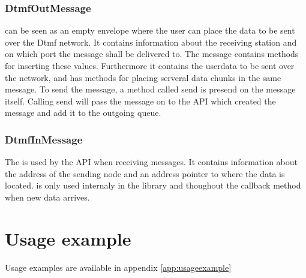 \subsubsection{DtmfOutMessage}
 can be seen as an empty envelope where the user can place the data to be sent over the Dtmf network. It contains information about the receiving station and on which port the message shall be delivered to. The message contains methods for inserting these values. Furthermore it contains the userdata to be sent over the network, and has methods for placing serveral data chunks in the same message. To send the message, a method called send is presend on the message itself. Calling send will pass the message on to the API which created the message and add it to the outgoing queue.

\subsubsection{DtmfInMessage}
The  is used by the API when receiving messages. It contains information about the address of the sending node and an address pointer to where the data is located.  is only used internaly in the library and thoughout the callback method when new data arrives.

\section{Usage example}
Usage examples are available in appendix \ref{app:usageexample}





